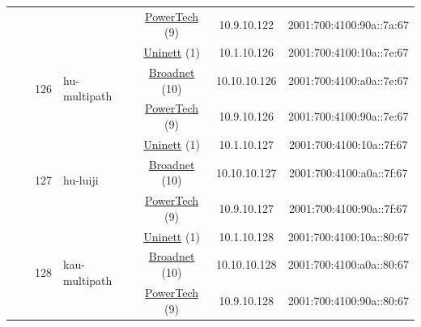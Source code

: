 \begin{small}
\begin{center}
\begin{longtable}{|c|c|c|c|c|c|c|c|}
  &  &  &  & \multicolumn{2}{|c|}{\tiny{\href{http://www.powertech.no}{PowerTech} (9)}} & \tiny{10.9.10.122} & \tiny{2001:700:4100:90a::7a:67} \\* \cline{3-3}\cline{4-4}\cline{5-5}\cline{6-6}\cline{7-7}\cline{8-8}
  &  & \multirow{3}{*}{\tiny{126}} & \multicolumn{1}{|l|}{\multirow{3}{*}{\tiny{hu-multipath}}} & \multicolumn{2}{|c|}{\tiny{\href{https://www.uninett.no}{Uninett} (1)}} & \tiny{10.1.10.126} & \tiny{2001:700:4100:10a::7e:67} \\* \cline{5-5}\cline{6-6}\cline{7-7}\cline{8-8}
  &  &  &  & \multicolumn{2}{|c|}{\tiny{\href{https://www.broadnet.no}{Broadnet} (10)}} & \tiny{10.10.10.126} & \tiny{2001:700:4100:a0a::7e:67} \\* \cline{5-5}\cline{6-6}\cline{7-7}\cline{8-8}
  &  &  &  & \multicolumn{2}{|c|}{\tiny{\href{http://www.powertech.no}{PowerTech} (9)}} & \tiny{10.9.10.126} & \tiny{2001:700:4100:90a::7e:67} \\* \cline{3-3}\cline{4-4}\cline{5-5}\cline{6-6}\cline{7-7}\cline{8-8}
  &  & \multirow{3}{*}{\tiny{127}} & \multicolumn{1}{|l|}{\multirow{3}{*}{\tiny{hu-luiji}}} & \multicolumn{2}{|c|}{\tiny{\href{https://www.uninett.no}{Uninett} (1)}} & \tiny{10.1.10.127} & \tiny{2001:700:4100:10a::7f:67} \\* \cline{5-5}\cline{6-6}\cline{7-7}\cline{8-8}
  &  &  &  & \multicolumn{2}{|c|}{\tiny{\href{https://www.broadnet.no}{Broadnet} (10)}} & \tiny{10.10.10.127} & \tiny{2001:700:4100:a0a::7f:67} \\* \cline{5-5}\cline{6-6}\cline{7-7}\cline{8-8}
  &  &  &  & \multicolumn{2}{|c|}{\tiny{\href{http://www.powertech.no}{PowerTech} (9)}} & \tiny{10.9.10.127} & \tiny{2001:700:4100:90a::7f:67} \\* \cline{3-3}\cline{4-4}\cline{5-5}\cline{6-6}\cline{7-7}\cline{8-8}
  &  & \multirow{3}{*}{\tiny{128}} & \multicolumn{1}{|l|}{\multirow{3}{*}{\tiny{kau-multipath}}} & \multicolumn{2}{|c|}{\tiny{\href{https://www.uninett.no}{Uninett} (1)}} & \tiny{10.1.10.128} & \tiny{2001:700:4100:10a::80:67} \\* \cline{5-5}\cline{6-6}\cline{7-7}\cline{8-8}
  &  &  &  & \multicolumn{2}{|c|}{\tiny{\href{https://www.broadnet.no}{Broadnet} (10)}} & \tiny{10.10.10.128} & \tiny{2001:700:4100:a0a::80:67} \\* \cline{5-5}\cline{6-6}\cline{7-7}\cline{8-8}
  &  &  &  & \multicolumn{2}{|c|}{\tiny{\href{http://www.powertech.no}{PowerTech} (9)}} & \tiny{10.9.10.128} & \tiny{2001:700:4100:90a::80:67} \\* \cline{3-3}\cline{4-4}\cline{5-5}\cline{6-6}\cline{7-7}\cline{8-8}

\end{longtable}
\end{center}
\end{small}
